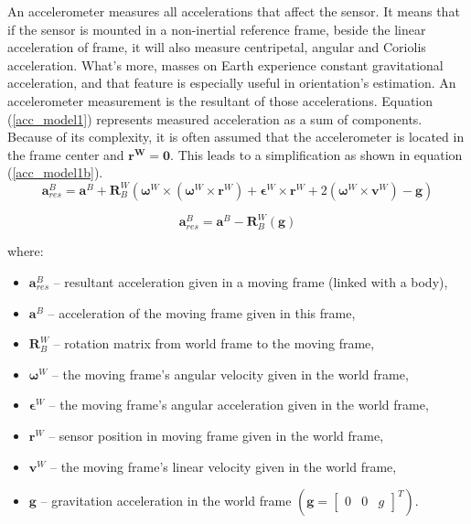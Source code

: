 An accelerometer measures all accelerations that affect the sensor. It means that if the sensor is mounted in a non-inertial reference frame, beside the linear acceleration of frame, it will also measure centripetal, angular and Coriolis acceleration. What's more, masses on Earth experience constant gravitational acceleration, and that feature is especially useful in orientation's estimation. An accelerometer measurement is the resultant of those accelerations. Equation (\ref{acc_model1}) represents measured acceleration as a sum of components. Because of its complexity, it is often assumed that the accelerometer is located in the frame center and $\bm{r^W} = \bm{0}$. This leads to a simplification as shown in equation (\ref{acc_model1b}).
\\
\begin{equation}
	\bm{a}_{res}^B = \bm{a}^B + \bm{R}^W_B \left( \bm{\omega}^W \times \left( \bm{\omega}^W \times \bm{r}^W \right) + \bm{\epsilon}^W \times \bm{r}^W + 2\left( \bm{\omega}^W \times \bm{v}^W \right) - \bm{g}  \right)  
	\label{acc_model1}
\end{equation}

\begin{equation}
	\bm{a}_{res}^B = \bm{a}^B - \bm{R}^W_B \left( \bm{g}  \right)  
	\label{acc_model1b}
\end{equation}

where:
\begin{itemize}
	\item $\bm{a}_{res}^B$ -- resultant acceleration given in a moving frame (linked with a body),
	\item $\bm{a}^B$ -- acceleration of the moving frame given in this frame,
	\item $\bm{R}^W_B$ -- rotation matrix from world frame to the moving frame,
	\item $\bm{\omega}^W$ -- the moving frame's angular velocity given in the world frame,
	\item $\bm{\epsilon}^W$ -- the moving frame's angular acceleration given in the world frame,
	\item $\bm{r}^W$ -- sensor position in moving frame given in the world frame,
	\item $\bm{v}^W$ -- the moving frame's linear velocity given in the world frame,
	\item $\bm{g}$ -- gravitation acceleration in the world frame $\left( \bm{g} = \begin{bmatrix}
		0 &  0 &  g
	\end{bmatrix}^T \right)$.
\end{itemize}

